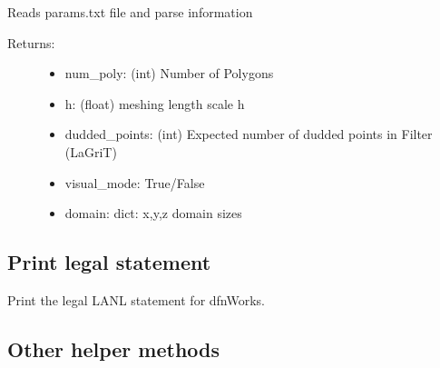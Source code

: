\documentclass[letterpaper,10pt,english]{sphinxmanual}
\begin{document}
\begin{fulllineitems}
\label{\detokenize{pydfnworks:pydfnworks.mesh_dfn_helper.parse_params_file}}
Reads params.txt file and parse information
\begin{description}
\item[{Returns:}] \leavevmode\begin{itemize}
\item {} 
num\_poly: (int) Number of Polygons

\item {} 
h: (float) meshing length scale h

\item {} 
dudded\_points: (int) Expected number of dudded points in Filter (LaGriT)

\item {} 
visual\_mode: True/False

\item {} 
domain: dict: x,y,z domain sizes

\end{itemize}

\end{description}

\end{fulllineitems}



\subsection{Print legal statement}
\label{\detokenize{pydfnworks:print-legal-statement}}\label{\detokenize{pydfnworks:module-pydfnworks.legal}}

\begin{fulllineitems}
\label{\detokenize{pydfnworks:pydfnworks.legal.legal}}
Print the legal LANL statement for dfnWorks.

\end{fulllineitems}



\subsection{Other helper methods}
\label{\detokenize{pydfnworks:module-pydfnworks.helper}}\label{\detokenize{pydfnworks:other-helper-methods}}
\end{document}
